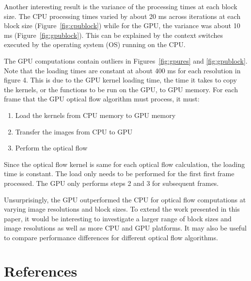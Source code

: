\documentclass[12pt,letterpaper]{article}
\begin{document}
Another interesting result is the variance of the processing times at each
block size. The CPU processing times varied by about 20 ms across iterations at
each block size (Figure~\ref{fig:cpublock}) while for the GPU, the variance was
about 10 ms (Figure~\ref{fig:gpublock}). This can be explained by the context
switches executed by the operating system (OS) running on the CPU.

The GPU computations contain outliers in Figures~\ref{fig:gpures} and
\ref{fig:gpublock}. Note that the loading times are constant at about 400 ms
for each resolution in figure 4. This is due to the GPU kernel loading time,
the time it takes to copy the kernels, or the functions to be run on the GPU,
to GPU memory. For each frame that the GPU optical flow algorithm must process,
it must:

\begin{enumerate}
  \item Load the kernels from CPU memory to GPU memory
  \item Transfer the images from CPU to GPU
  \item Perform the optical flow
\end{enumerate}

Since the optical flow kernel is same for each optical flow calculation, the
loading time is constant. The load only needs to be performed for the first
first frame processed. The GPU only performs steps 2 and 3 for subsequent
frames.

Unsurprisingly, the GPU outperformed the CPU for optical flow computations at
varying image resolutions and block sizes. To extend the work presented in this
paper, it would be interesting to investigate a larger range of block sizes and
image resolutions as well as more CPU and GPU platforms. It may also be useful
to compare performance differences for different optical flow algorithms. 
\section{References}
\nocite{*}


\end{document}
